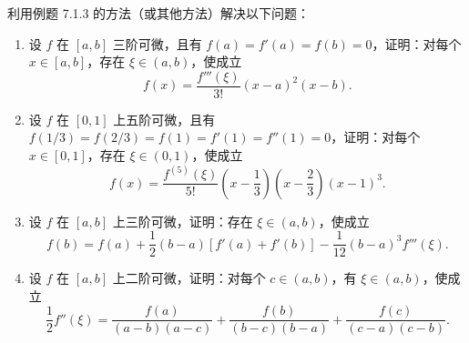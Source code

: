 \begin{xreferenceproblem}[9]
利用例题 7.1.3 的方法（或其他方法）解决以下问题：
\begin{enumerate}[label=(\arabic*)]
  \item 设 $f$ 在 $[a,b]$ 三阶可微，且有 $f(a)=f'(a)=f(b)=0$，证明：对每个 $x\in[a,b]$，存在 $\xi\in(a,b)$，使成立
  \[
    f(x)=\frac{f'''(\xi)}{3!}(x-a)^2(x-b).
  \]
  \item 设 $f$ 在 $[0,1]$ 上五阶可微，且有 $f(1/3)=f(2/3)=f(1)=f'(1)=f''(1)=0$，证明：对每个 $x\in[0,1]$，存在 $\xi\in(0,1)$，使成立
  \[
    f(x)=\frac{f^{(5)}(\xi)}{5!}\left(x-\frac13\right)\left(x-\frac23\right)(x-1)^3.
  \]
  \item 设 $f$ 在 $[a,b]$ 上三阶可微，证明：存在 $\xi\in(a,b)$，使成立
  \[
    f(b)=f(a)+\frac12(b-a)[f'(a)+f'(b)]-\frac{1}{12}(b-a)^3f'''(\xi).
  \]
  \item 设 $f$ 在 $[a,b]$ 上二阶可微，证明：对每个 $c\in(a,b)$，有 $\xi\in(a,b)$，使成立
  \[
    \frac12f''(\xi)
    =\frac{f(a)}{(a-b)(a-c)}
    +\frac{f(b)}{(b-c)(b-a)}
    +\frac{f(c)}{(c-a)(c-b)}.
  \]
\end{enumerate}
\end{xreferenceproblem}
